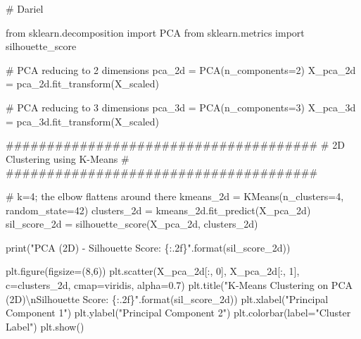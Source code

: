 \documentclass[
  letterpaper,
  DIV=11,
  numbers=noendperiod]{scrartcl}
\newenvironment{Shaded}{\begin{snugshade}}{\end{snugshade}}
\newcommand{\BuiltInTok}[1]{\textcolor[rgb]{0.00,0.23,0.31}{#1}}
\newcommand{\CharTok}[1]{\textcolor[rgb]{0.13,0.47,0.30}{#1}}
\newcommand{\CommentTok}[1]{\textcolor[rgb]{0.37,0.37,0.37}{#1}}
\newcommand{\DecValTok}[1]{\textcolor[rgb]{0.68,0.00,0.00}{#1}}
\newcommand{\FloatTok}[1]{\textcolor[rgb]{0.68,0.00,0.00}{#1}}
\newcommand{\ImportTok}[1]{\textcolor[rgb]{0.00,0.46,0.62}{#1}}
\newcommand{\NormalTok}[1]{\textcolor[rgb]{0.00,0.23,0.31}{#1}}
\newcommand{\OperatorTok}[1]{\textcolor[rgb]{0.37,0.37,0.37}{#1}}
\newcommand{\SpecialCharTok}[1]{\textcolor[rgb]{0.37,0.37,0.37}{#1}}
\newcommand{\StringTok}[1]{\textcolor[rgb]{0.13,0.47,0.30}{#1}}
\begin{document}
\begin{Shaded}
\begin{Highlighting}[]
\CommentTok{\# Dariel}

\ImportTok{from}\NormalTok{ sklearn.decomposition }\ImportTok{import}\NormalTok{ PCA}
\ImportTok{from}\NormalTok{ sklearn.metrics }\ImportTok{import}\NormalTok{ silhouette\_score}

\CommentTok{\# PCA reducing to 2 dimensions}
\NormalTok{pca\_2d }\OperatorTok{=}\NormalTok{ PCA(n\_components}\OperatorTok{=}\DecValTok{2}\NormalTok{)}
\NormalTok{X\_pca\_2d }\OperatorTok{=}\NormalTok{ pca\_2d.fit\_transform(X\_scaled)}

\CommentTok{\# PCA reducing to 3 dimensions}
\NormalTok{pca\_3d }\OperatorTok{=}\NormalTok{ PCA(n\_components}\OperatorTok{=}\DecValTok{3}\NormalTok{)}
\NormalTok{X\_pca\_3d }\OperatorTok{=}\NormalTok{ pca\_3d.fit\_transform(X\_scaled)}

\CommentTok{\#\#\#\#\#\#\#\#\#\#\#\#\#\#\#\#\#\#\#\#\#\#\#\#\#\#\#\#\#\#\#\#\#\#\#\#\#\#}
\CommentTok{\#     2D Clustering using K{-}Means    \#}
\CommentTok{\#\#\#\#\#\#\#\#\#\#\#\#\#\#\#\#\#\#\#\#\#\#\#\#\#\#\#\#\#\#\#\#\#\#\#\#\#\#}

\CommentTok{\# k=4; the elbow flattens around there}
\NormalTok{kmeans\_2d }\OperatorTok{=}\NormalTok{ KMeans(n\_clusters}\OperatorTok{=}\DecValTok{4}\NormalTok{, random\_state}\OperatorTok{=}\DecValTok{42}\NormalTok{)}
\NormalTok{clusters\_2d }\OperatorTok{=}\NormalTok{ kmeans\_2d.fit\_predict(X\_pca\_2d)}
\NormalTok{sil\_score\_2d }\OperatorTok{=}\NormalTok{ silhouette\_score(X\_pca\_2d, clusters\_2d)}

\BuiltInTok{print}\NormalTok{(}\StringTok{"PCA (2D) {-} Silhouette Score: }\SpecialCharTok{\{:.2f\}}\StringTok{"}\NormalTok{.}\BuiltInTok{format}\NormalTok{(sil\_score\_2d))}

\NormalTok{plt.figure(figsize}\OperatorTok{=}\NormalTok{(}\DecValTok{8}\NormalTok{,}\DecValTok{6}\NormalTok{))}
\NormalTok{plt.scatter(X\_pca\_2d[:, }\DecValTok{0}\NormalTok{], X\_pca\_2d[:, }\DecValTok{1}\NormalTok{], c}\OperatorTok{=}\NormalTok{clusters\_2d, cmap}\OperatorTok{=}\StringTok{\textquotesingle{}viridis\textquotesingle{}}\NormalTok{, alpha}\OperatorTok{=}\FloatTok{0.7}\NormalTok{)}
\NormalTok{plt.title(}\StringTok{"K{-}Means Clustering on PCA (2D)}\CharTok{\textbackslash{}n}\StringTok{Silhouette Score: }\SpecialCharTok{\{:.2f\}}\StringTok{"}\NormalTok{.}\BuiltInTok{format}\NormalTok{(sil\_score\_2d))}
\NormalTok{plt.xlabel(}\StringTok{"Principal Component 1"}\NormalTok{)}
\NormalTok{plt.ylabel(}\StringTok{"Principal Component 2"}\NormalTok{)}
\NormalTok{plt.colorbar(label}\OperatorTok{=}\StringTok{"Cluster Label"}\NormalTok{)}
\NormalTok{plt.show()}


\end{Highlighting}
\end{Shaded}
\end{document}
